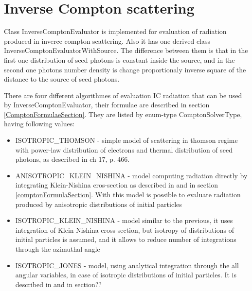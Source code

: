 \section{Inverse Compton scattering}
Class InverseComptonEvaluator is implemented for evaluation of radiation produced in inverce compton scattering. Also it has one derived class InverseComptonEvaluatorWithSource. The difference between them is that in the first one distribution of seed photons is constant inside the source, and in the second one photons number density is change proportionaly inverse square of the distance to the source of seed photons.

There are four different algorithmes of evaluation IC radiation that can be used by InverseComptonEvaluator, their formulae are described in section \ref{ComptonFormulaeSection}. They are listed by enum-type ComptonSolverType, having following values:

\begin{itemize}
	\item ISOTROPIC\_THOMSON - simple model of scattering in thomson regime with power-law distribution of electrons and thermal distribution of seed photons, as described in \cite{Ginzburg1975} ch 17, p. 466.
	\item ANISOTROPIC\_KLEIN\_NISHINA - model computing radiation directly by integrating Klein-Nishina cros-section as described in \cite{KleinNishina, Dubus} and in section \ref{comptonFormulaSection}. With this model is possible to evaluate radiation produced by anisotropic distributions of initial particles
	\item ISOTROPIC\_KLEIN\_NISHINA - model similar to the previous, it uses integration of Klein-Nishina cross-section, but isotropy of distributions of initial particles is assumed, and it allows to reduce number of integrations through the azimuthal angle
	\item ISOTROPIC\_JONES - model, using analytical integration through the all angular variables, in case of isotropic distributions of initial particles. It is described in \cite{JonesCompton, BykovUvarov2000} and in section??
\end{itemize}

